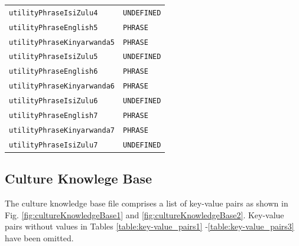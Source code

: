\documentclass{CSSRforAfrica}
\begin{document}
\begin{table}[H]
\begin{tabular}{l l}
{\footnotesize \verb+utilityPhraseIsiZulu4+}             & {\footnotesize \verb+UNDEFINED+ }\vspace{-1.5mm} \\
{\footnotesize \verb+utilityPhraseEnglish5+}             & {\footnotesize \verb+PHRASE+ } \vspace{-1.5mm}  \\
{\footnotesize \verb+utilityPhraseKinyarwanda5+}    & {\footnotesize \verb+PHRASE+}  \vspace{-1.5mm} \\
{\footnotesize \verb+utilityPhraseIsiZulu5+}             & {\footnotesize \verb+UNDEFINED+ }\vspace{-1.5mm} \\
{\footnotesize \verb+utilityPhraseEnglish6+}             & {\footnotesize \verb+PHRASE+ } \vspace{-1.5mm}  \\
{\footnotesize \verb+utilityPhraseKinyarwanda6+}    & {\footnotesize \verb+PHRASE+}  \vspace{-1.5mm} \\
{\footnotesize \verb+utilityPhraseIsiZulu6+}             & {\footnotesize \verb+UNDEFINED+ }\vspace{-1.5mm} \\
{\footnotesize \verb+utilityPhraseEnglish7+}             & {\footnotesize \verb+PHRASE+ } \vspace{-1.5mm}  \\
{\footnotesize \verb+utilityPhraseKinyarwanda7+}    & {\footnotesize \verb+PHRASE+}  \vspace{-1.5mm} \\
{\footnotesize \verb+utilityPhraseIsiZulu7+}             & {\footnotesize \verb+UNDEFINED+ }\vspace{-1.5mm} \\
\end{tabular}
\end{table}


\subsection{Culture Knowlege Base}
The culture knowledge base  file comprises a list of key-value pairs as shown in Fig. \ref{fig:cultureKnowledgeBase1} and \ref{fig:cultureKnowledgeBase2}.  Key-value pairs without values in Tables \ref{table:key-value_pairs1} -\ref{table:key-value_pairs3} have been omitted.  
 
\end{document}
